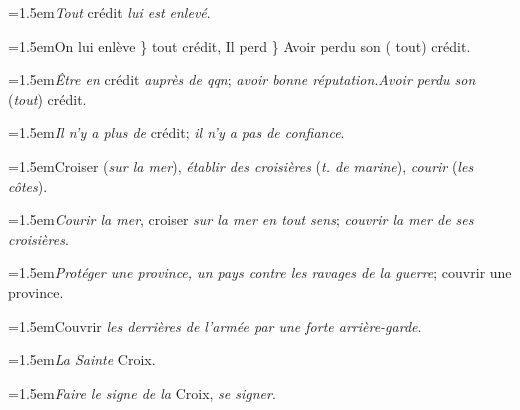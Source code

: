 \par{\dictfontsize\hangindent=1.5em\noindent \textit{Tout} crédit \textit{lui est enlevé}. \par}
\par{\dictfontsize\hangindent=1.5em\noindent On lui enlève \} tout crédit, Il perd \} Avoir perdu son ( tout) crédit. \par}
\par{\dictfontsize\hangindent=1.5em\noindent \textit{Être en} crédit \textit{auprès de qqn}; \textit{avoir bonne réputation}.\textit{Avoir perdu son} (\textit{tout}) crédit. \par}
\par{\dictfontsize\hangindent=1.5em\noindent \textit{Il n’y a plus de} crédit; \textit{il n’y a pas de confiance}. \par}
\par{\dictfontsize\hangindent=1.5em\noindent Croiser (\textit{sur la mer}), \textit{établir des croisières} (\textit{t. de marine}), \textit{courir} (\textit{les côtes}). \par}
\par{\dictfontsize\hangindent=1.5em\noindent \textit{Courir la mer}, croiser \textit{sur la mer en tout sens}; \textit{couvrir la mer de ses croisières}. \par}
\par{\dictfontsize\hangindent=1.5em\noindent \textit{Protéger une province, un pays contre les ravages de la guerre}; couvrir une province. \par}
\par{\dictfontsize\hangindent=1.5em\noindent Couvrir \textit{les derrières de l’armée par une forte arrière-garde}. \par}
\par{\dictfontsize\hangindent=1.5em\noindent \textit{La Sainte} Croix. \par}
\par{\dictfontsize\hangindent=1.5em\noindent \textit{Faire le signe de la} Croix, \textit{se signer}. \par}
